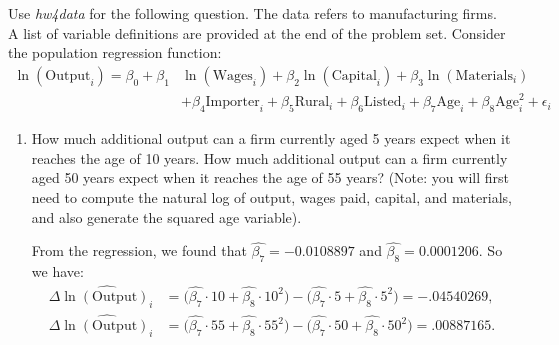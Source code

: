 \documentclass[11pt,twoside,openany]{memoir}
\begin{document}
    \begin{question}
        Use \textit{hw4data} for the following question. The data refers to manufacturing firms. A list of variable definitions are provided at the end of the problem set. Consider the population regression function:
            \begin{equation*}
            \begin{split}
                \ln(\text{Output}_i) = \beta_0 + \beta_1 &\ln(\text{Wages}_i) + \beta_2 \ln(\text{Capital}_i) + \beta_3 \ln(\text{Materials}_i) \\
                & + \beta_4 \text{Importer}_i + \beta_5 \text{Rural}_i + \beta_6 \text{Listed}_i + \beta_7 \text{Age}_i + \beta_8 \text{Age}^2_i + \epsilon_i
            \end{split}
            \end{equation*} 
        \begin{enumerate}[label = (\alph*),itemsep=1pt,topsep=3pt]
            \item How much additional output can a firm currently aged 5 years expect when it reaches the age of 10 years. How much additional output can a firm currently aged 50 years expect when it reaches the age of 55 years? (Note: you will first need to compute the natural log of output, wages paid, capital, and materials, and also generate the squared age variable).
                {\color{blue} \begin{solution}
                    From the regression, we found that $\widehat{\beta_7} = -0.0108897$ and $\widehat{\beta_8} = 0.0001206$. So we have:
                        \begin{equation*}
                        \begin{split}
                            \Delta \widehat{\ln(\text{Output})_i} &= \bigl(\widehat{\beta_7}\cdot10 + \widehat{\beta_8}\cdot 10^2 \bigr) - \bigl(\widehat{\beta_7}\cdot5 + \widehat{\beta_8}\cdot 5^2 \bigr) = -.04540269,\\
                            \Delta \widehat{\ln(\text{Output})_i} &= \bigl(\widehat{\beta_7}\cdot55 + \widehat{\beta_8}\cdot 55^2 \bigr) - \bigl(\widehat{\beta_7}\cdot50 + \widehat{\beta_8}\cdot 50^2 \bigr) = .00887165.
                        \end{split}
                        \end{equation*}
                \end{solution}}


\end{enumerate}
\end{question}
\end{document}
